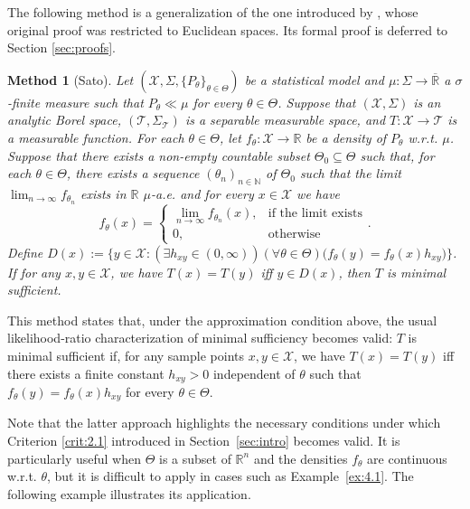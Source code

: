 \documentclass[12pt]{article}
\newtheorem{method}{Method}[section]
\begin{document}
The following method is a generalization of the one introduced by \cite{Sato1996}, whose original proof was restricted to Euclidean spaces. Its formal proof is deferred to Section \ref{sec:proofs}.

\begin{method}[Sato]
\label{meth:3.2}
Let $(\mathcal{X},\Sigma ,\{P_\theta\}_{\theta\in\Theta })$ be a statistical model and $\mu:\Sigma\to\overline{\mathbb{R}}$ a $\sigma$-finite measure such that $P_\theta \ll \mu$ for every $\theta\in\Theta$. Suppose that $(\mathcal{X},\Sigma )$ is an analytic Borel space, $(\mathcal{T},\Sigma_\mathcal{T})$ is a separable measurable space, and $T:\mathcal{X}\to\mathcal{T}$ is a measurable function. For each $\theta\in\Theta$, let $f_\theta :\mathcal{X}\to \mathbb{R}$ be a density of $P_\theta $ w.r.t. $\mu$. Suppose that there exists a non-empty countable subset $\Theta _0\subseteq\Theta$ such that, for each $\theta\in\Theta$, there exists a sequence $(\theta _n)_{n\in\mathbb{N}}$ of $\Theta _0$ such that the limit $\lim_{n\to\infty}f_{\theta_n}$ exists in $\mathbb{R}$ $\mu$-a.e. and for every $x\in\mathcal{X}$ we have
$$f_\theta (x)=\begin{cases}\lim_{n\to \infty}f_{\theta _n}(x),&\text{if the limit exists}\\0,&\text{otherwise}\end{cases}.$$
Define $D(x):=\big\{y\in \mathcal{X}:(\exists h_{xy}\in (0,\infty ))(\forall \theta \in \Theta )\big(f_\theta (y)=f_\theta (x)h_{xy}\big)\big\}$. If for any $x,y\in\mathcal{X}$, we have $T(x)=T(y)$ iff $y\in D(x)$, then $T$ is minimal sufficient.
\end{method}

This method states that, under the approximation condition above, the usual likelihood-ratio characterization of minimal sufficiency becomes valid: $T$ is minimal sufficient if, for any sample points $x,y\in\mathcal{X}$, we have $T(x)=T(y)$ iff there exists a finite constant $h_{xy}>0$ independent of $\theta $ such that $f_\theta (y)=f_\theta (x)h_{xy}$ for every $\theta\in\Theta$.

Note that the latter approach highlights the necessary conditions under which Criterion \ref{crit:2.1} introduced in Section~\ref{sec:intro}  becomes valid. It is particularly useful when $\Theta$ is a subset of $\mathbb{R}^n$ and the densities $f_\theta$ are continuous w.r.t. $\theta$, but it is difficult to apply in cases such as Example~\ref{ex:4.1}. The following example illustrates its application.
\end{document}
